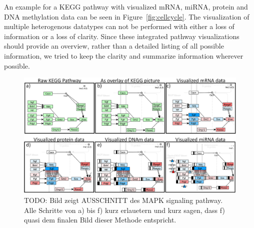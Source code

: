 \documentclass{bioinfo}
\begin{document}
An example for a KEGG pathway with visualized mRNA, miRNA, protein and DNA methylation data can be
seen in Figure~\ref{fig:cellcycle}. The visualization of multiple heterogenous datatypes can not be
performed with either a loss of information or a loss of clarity. Since these integrated pathway
visualizations should provide an overview, rather than a detailed listing of all possible
information, we tried to keep the clarity and summarize information wherever possible.  



\begin{figure}[t] \centering \includegraphics[width=1.0\textwidth]{figures/visualization-steps.png}
\caption{ TODO: Bild zeigt AUSSCHNITT des MAPK signaling pathway. Alle Schritte von a) bis f) kurz
          erlauetern und kurz sagen, dass f) quasi dem finalen Bild dieser Methode entspricht. }
\label{fig:visualization_steps} 
\end{figure}


\end{document}
